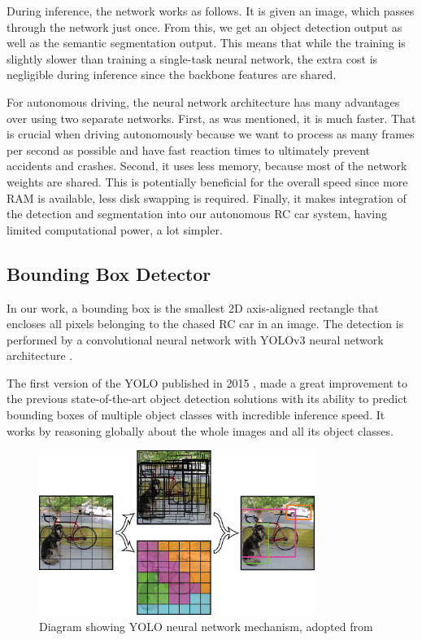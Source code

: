 \documentclass{ctuthesis/ctuthesis}
\begin{document}
During inference, the network works as follows. It is given an image, which passes through the network just once. From this, we get an object detection output as well as the semantic segmentation output. This means that while the training is slightly slower than training a single-task neural network, the extra cost is negligible during inference since the backbone features are shared. \par


For autonomous driving, the neural network architecture has many advantages over using two separate networks. First, as was mentioned, it is much faster. That is crucial when driving autonomously because we want to process as many frames per second as possible and have fast reaction times to ultimately prevent accidents and crashes. Second, it uses less memory, because most of the network weights are shared. This is potentially beneficial for the overall speed since more RAM is available, less disk swapping is required. Finally, it makes integration of the detection and segmentation into our autonomous RC car system, having limited computational power, a lot simpler.




\subsection{Bounding Box Detector} \label{s:detection}
In our work, a bounding box is the smallest 2D axis-aligned rectangle that encloses all pixels belonging to the chased RC car in an image. The detection is performed by a convolutional neural network \cite{CNN_Lecun} with YOLOv3 neural network architecture \cite{YOLOv3}. \par 
The first version of the YOLO published in 2015 \cite{YOLO}, made a great improvement to the previous state-of-the-art object detection solutions with its ability to predict bounding boxes of multiple object classes with incredible inference speed. It works by reasoning globally about the whole images and all its object classes. \par


\begin{figure}[h!]
    \centering
    \includegraphics[width=0.8\textwidth]{images/YOLO.png}
    
    \caption[Diagram showing YOLO neural network mechanism]{Diagram showing YOLO neural network mechanism, adopted from \protect\cite{YOLO}}\label{f:YOLO}
\end{figure}
\end{document}
